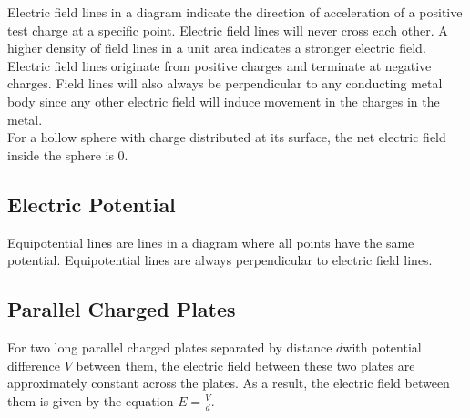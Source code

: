\documentclass[../main]{subfiles}
\begin{document}
	Electric field lines in a diagram indicate the direction of acceleration of a positive test charge at a specific point. Electric field lines will never cross each other. A higher density of field lines in a unit area indicates a stronger electric field. \\

	Electric field lines originate from positive charges and terminate at negative charges. Field lines will also always be perpendicular to any conducting metal body since any other electric field will induce movement in the charges in the metal. \\

	For a hollow sphere with charge distributed at its surface, the net electric field inside the sphere is \(0\).

	\subsection{Electric Potential}



	Equipotential lines are lines in a diagram where all points have the same potential. Equipotential lines are always perpendicular to electric field lines.

	\subsection{Parallel Charged Plates}

	For two long parallel charged plates separated by distance \(d\)with potential difference \(V\) between them, the electric field between these two plates are approximately constant across the plates. As a result, the electric field between them is given by the equation \( E = \frac{V}{d} \).
\end{document}
